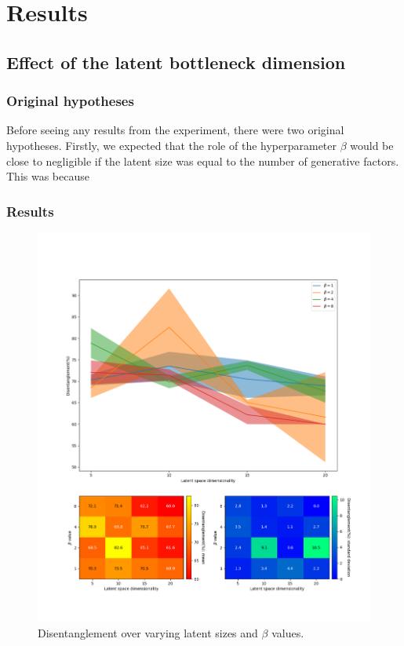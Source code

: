 \chapter{Results} \label{ch:results}
    \section{Effect of the latent bottleneck dimension}
        \subsection{Original hypotheses}
            Before seeing any results from the experiment, there were two original hypotheses. Firstly, we expected that the role of the hyperparameter $\beta$ would be close to negligible if the latent size was equal to the number of generative factors. This was because 
        \subsection{Results}
            \begin{figure}[H]
                \centering
                \includegraphics[width=1\textwidth]{imgs/latent_last.png}
                \caption{Disentanglement over varying latent sizes and $\beta$ values. }
                \label{fig:latent_last}
            \end{figure}
            
